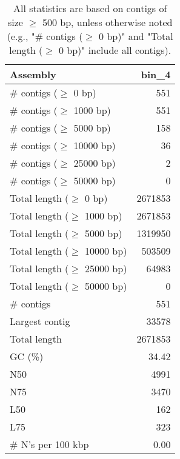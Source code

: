 \documentclass[12pt,a4paper]{article}
\begin{document}
\begin{table}[ht]
\begin{center}
\caption{All statistics are based on contigs of size $\geq$ 500 bp, unless otherwise noted (e.g., "\# contigs ($\geq$ 0 bp)" and "Total length ($\geq$ 0 bp)" include all contigs).}
\begin{tabular}{|l*{1}{|r}|}
\hline
Assembly & bin\_4 \\ \hline
\# contigs ($\geq$ 0 bp) & 551 \\ \hline
\# contigs ($\geq$ 1000 bp) & 551 \\ \hline
\# contigs ($\geq$ 5000 bp) & 158 \\ \hline
\# contigs ($\geq$ 10000 bp) & 36 \\ \hline
\# contigs ($\geq$ 25000 bp) & 2 \\ \hline
\# contigs ($\geq$ 50000 bp) & 0 \\ \hline
Total length ($\geq$ 0 bp) & 2671853 \\ \hline
Total length ($\geq$ 1000 bp) & 2671853 \\ \hline
Total length ($\geq$ 5000 bp) & 1319950 \\ \hline
Total length ($\geq$ 10000 bp) & 503509 \\ \hline
Total length ($\geq$ 25000 bp) & 64983 \\ \hline
Total length ($\geq$ 50000 bp) & 0 \\ \hline
\# contigs & 551 \\ \hline
Largest contig & 33578 \\ \hline
Total length & 2671853 \\ \hline
GC (\%) & 34.42 \\ \hline
N50 & 4991 \\ \hline
N75 & 3470 \\ \hline
L50 & 162 \\ \hline
L75 & 323 \\ \hline
\# N's per 100 kbp & 0.00 \\ \hline
\end{tabular}
\end{center}
\end{table}
\end{document}
